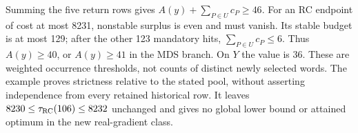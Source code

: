 Summing the five return rows gives $A(y)+\sum_{P\in U}c_P\ge46$.
For an RC endpoint of cost at most 8231, nonstable surplus is even and must
vanish. Its stable budget is at most 129; after the other 123 mandatory hits,
$\sum_{P\in U}c_P\le6$. Thus $A(y)\ge40$, or $A(y)\ge41$ in the MDS branch.
On $Y$ the value is 36. These are weighted occurrence thresholds, not counts
of distinct newly selected words. The example proves strictness relative to
the stated pool, without asserting independence from every retained historical
row. It leaves $8230\le\tau_{\operatorname{RC}}(106)\le8232$ unchanged and gives no global
lower bound or attained optimum in the new real-gradient class.
